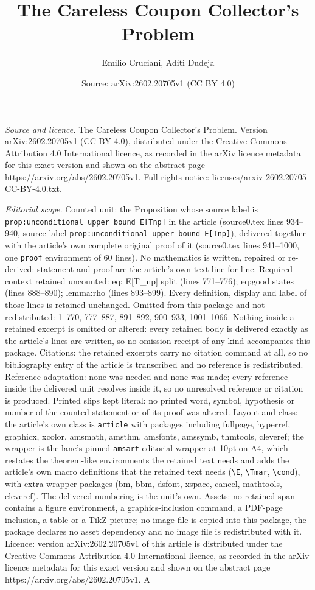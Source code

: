 \documentclass[10pt,a4paper]{amsart}
\title[The Careless Coupon Collector's Problem]{The Careless Coupon Collector's Problem}
\author{Emilio Cruciani, Aditi Dudeja}
\date{Source: arXiv:2602.20705v1 (CC BY 4.0)}
\begin{document}
\maketitle

\noindent\emph{Source and licence.} The Careless Coupon Collector's Problem. Version arXiv:2602.20705v1 (CC BY 4.0), distributed under the Creative Commons Attribution 4.0 International licence, as recorded in the arXiv licence metadata for this exact version and shown on the abstract page https://arxiv.org/abs/2602.20705v1. Full rights notice: licenses/arxiv-2602.20705-CC-BY-4.0.txt.\par\smallskip

\noindent\textit{Editorial scope.} Counted unit: the Proposition whose source label is \texttt{prop:unconditional upper bound E[Tnp]} in the article (source0.tex lines 934--940, source label \texttt{prop:unconditional upper bound E[Tnp]}), delivered together with the article's own complete original proof of it (source0.tex lines 941--1000, one \texttt{proof} environment of 60 lines). No mathematics is written, repaired or re-derived: statement and proof are the article's own text line for line. Required context retained uncounted: eq: E[T\_np] split (lines 771--776); eq:good states (lines 888--890); lemma:rho (lines 893--899). Every definition, display and label of those lines is retained unchanged. Omitted from this package and not redistributed: 1--770, 777--887, 891--892, 900--933, 1001--1066. Nothing inside a retained excerpt is omitted or altered: every retained body is delivered exactly as the article's lines are written, so no omission receipt of any kind accompanies this package. Citations: the retained excerpts carry no citation command at all, so no bibliography entry of the article is transcribed and no reference is redistributed. Reference adaptation: none was needed and none was made; every reference inside the delivered unit resolves inside it, so no unresolved reference or citation is produced. Printed slips kept literal: no printed word, symbol, hypothesis or number of the counted statement or of its proof was altered. Layout and class: the article's own class is \texttt{article} with packages including fullpage, hyperref, graphicx, xcolor, amsmath, amsthm, amsfonts, amssymb, thmtools, cleveref; the wrapper is the lane's pinned \texttt{amsart} editorial wrapper at 10pt on A4, which restates the theorem-like environments the retained text needs and adds the article's own macro definitions that the retained text needs (\texttt{\textbackslash E}, \texttt{\textbackslash Tmar}, \texttt{\textbackslash cond}), with extra wrapper packages (bm, bbm, dsfont, xspace, cancel, mathtools, cleveref). The delivered numbering is the unit's own. Assets: no retained span contains a figure environment, a graphics-inclusion command, a PDF-page inclusion, a table or a TikZ picture; no image file is copied into this package, the package declares no asset dependency and no image file is redistributed with it. Licence: version arXiv:2602.20705v1 of this article is distributed under the Creative Commons Attribution 4.0 International licence, as recorded in the arXiv licence metadata for this exact version and shown on the abstract page https://arxiv.org/abs/2602.20705v1. A 
\end{document}
